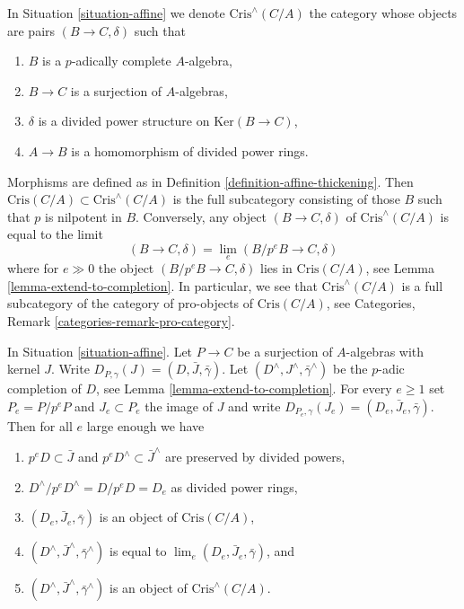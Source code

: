 \begin{remark}
\label{remark-completed-affine-site}
In Situation \ref{situation-affine} we denote
$\text{Cris}^\wedge(C/A)$ the category whose objects are
pairs $(B \to C, \delta)$ such that
\begin{enumerate}
\item $B$ is a $p$-adically complete $A$-algebra,
\item $B \to C$ is a surjection of $A$-algebras,
\item $\delta$ is a divided power structure on $\text{Ker}(B \to C)$,
\item $A \to B$ is a homomorphism of divided power rings.
\end{enumerate}
Morphisms are defined as in Definition \ref{definition-affine-thickening}.
Then $\text{Cris}(C/A) \subset \text{Cris}^\wedge(C/A)$ is the full
subcategory consisting of those $B$ such that $p$ is nilpotent in $B$.
Conversely, any object $(B \to C, \delta)$ of $\text{Cris}^\wedge(C/A)$
is equal to the limit
$$
(B \to C, \delta) = \lim_e (B/p^eB \to C, \delta)
$$
where for $e \gg 0$ the object $(B/p^eB \to C, \delta)$ lies
in $\text{Cris}(C/A)$, see
Lemma \ref{lemma-extend-to-completion}.
In particular, we see that $\text{Cris}^\wedge(C/A)$ is a full subcategory
of the category of pro-objects of $\text{Cris}(C/A)$, see
Categories, Remark \ref{categories-remark-pro-category}.
\end{remark}

\begin{lemma}
\label{lemma-list-properties}
In Situation \ref{situation-affine}.
Let $P \to C$ be a surjection of $A$-algebras with kernel $J$.
Write $D_{P, \gamma}(J) = (D, \bar J, \bar\gamma)$.
Let $(D^\wedge, J^\wedge, \bar\gamma^\wedge)$ be the
$p$-adic completion of $D$, see Lemma \ref{lemma-extend-to-completion}.
For every $e \geq 1$ set $P_e = P/p^eP$ and $J_e \subset P_e$
the image of $J$ and write
$D_{P_e, \gamma}(J_e) = (D_e, \bar J_e, \bar\gamma)$.
Then for all $e$ large enough we have
\begin{enumerate}
\item $p^eD \subset \bar J$ and $p^eD^\wedge \subset \bar J^\wedge$
are preserved by divided powers,
\item $D^\wedge/p^eD^\wedge = D/p^eD = D_e$ as divided power rings,
\item $(D_e, \bar J_e, \bar\gamma)$ is an object of $\text{Cris}(C/A)$,
\item $(D^\wedge, \bar J^\wedge, \bar\gamma^\wedge)$ is equal to
$\lim_e (D_e, \bar J_e, \bar\gamma)$, and
\item $(D^\wedge, \bar J^\wedge, \bar\gamma^\wedge)$ is an object of
$\text{Cris}^\wedge(C/A)$.
\end{enumerate}
\end{lemma}

